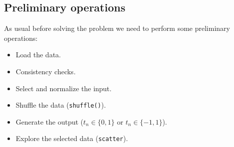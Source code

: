 \subsection{Preliminary operations}
As usual before solving the problem we need to perform some preliminary operations:
\begin{itemize}
    \item Load the data.
    \item Consistency checks.
    \item Select and normalize the input.
    \item Shuffle the data (\texttt{shuffle()}).
    \item Generate the output ($t_n \in \{0, 1\}$ or $t_n \in \{-1, 1\}$).
    \item Explore the selected data (\texttt{scatter}).
\end{itemize}
